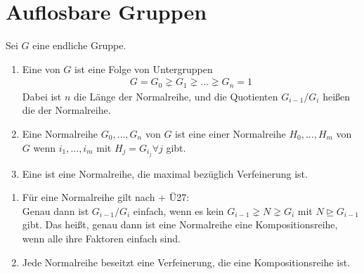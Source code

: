 \section{Auflosbare Gruppen}

Sei $G$ eine endliche Gruppe.

\begin{definition}
	\begin{enumerate}
		\item Eine  von $G$ ist eine Folge von Untergruppen
		\begin{align}
		G = G_0 \gneq G_1 \gneq ... \gneq G_n = 1
		\end{align}
		Dabei ist $n$ die Länge der Normalreihe, und die Quotienten $G_{i-1}/G_i$ heißen die  der Normalreihe.
		\item Eine Normalreihe $G_0, \dots, G_n$ von $G$ ist eine  einer Normalreihe $H_0,\dots,H_m$  von $G$ wenn $i_1,\dots,i_m$ mit $H_j = G_{i_{j}} \forall j$ gibt.
		\item Eine  ist eine Normalreihe, die maximal bezüglich Verfeinerung ist.
	\end{enumerate}
\end{definition}

\begin{remark}
	\begin{enumerate}
		\item Für eine Normalreihe  gilt nach  + Ü27:\\ %
		Genau dann ist $G_{i-1}/G_i$ einfach, wenn es kein $G_{i-1} \gneq N \gneq G_i$ mit $N \unrhd G_{i-1}$ gibt. Das heißt, genau dann ist eine Normalreihe eine Kompositionsreihe, wenn alle ihre Faktoren einfach sind. %
		\item Jede Normalreihe beseitzt eine Verfeinerung, die eine Kompositionsreihe ist.
	\end{enumerate}
\end{remark}

